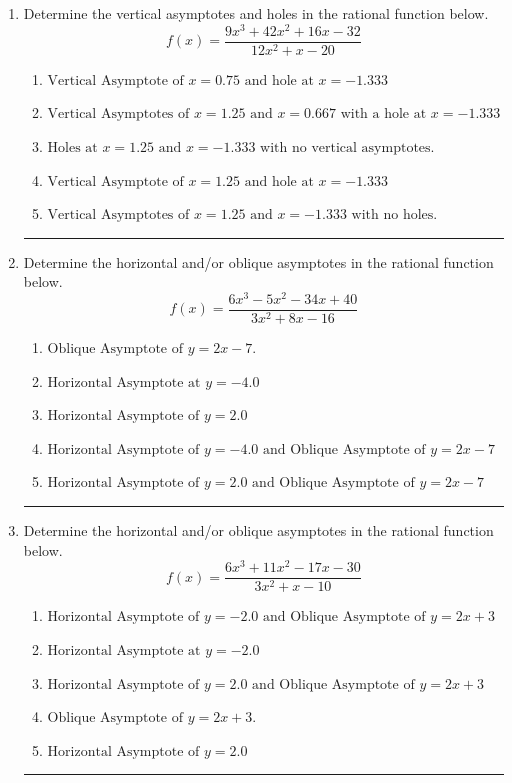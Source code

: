 \documentclass[14pt]{extbook}
\newcommand{\litem}[1]{\item#1\hspace*{-1cm}\rule{\textwidth}{0.4pt}}
\begin{document}
\begin{enumerate}
{\begin{enumerate}[label=\Alph*.]
\end{enumerate} }
\litem{
Determine the vertical asymptotes and holes in the rational function below.\[ f(x) = \frac{9x^{3} +42 x^{2} +16 x -32}{12x^{2} +x -20} \]\begin{enumerate}[label=\Alph*.]
\item \( \text{Vertical Asymptote of } x = 0.75 \text{ and hole at } x = -1.333 \)
\item \( \text{Vertical Asymptotes of } x = 1.25 \text{ and } x = 0.667 \text{ with a hole at } x = -1.333 \)
\item \( \text{Holes at } x = 1.25 \text{ and } x = -1.333 \text{ with no vertical asymptotes.} \)
\item \( \text{Vertical Asymptote of } x = 1.25 \text{ and hole at } x = -1.333 \)
\item \( \text{Vertical Asymptotes of } x = 1.25 \text{ and } x = -1.333 \text{ with no holes.} \)

\end{enumerate} }
\litem{
Determine the horizontal and/or oblique asymptotes in the rational function below.\[ f(x) = \frac{6x^{3} -5 x^{2} -34 x + 40}{3x^{2} +8 x -16} \]\begin{enumerate}[label=\Alph*.]
\item \( \text{Oblique Asymptote of } y = 2x -7. \)
\item \( \text{Horizontal Asymptote at } y = -4.0 \)
\item \( \text{Horizontal Asymptote of } y = 2.0  \)
\item \( \text{Horizontal Asymptote of } y = -4.0 \text{ and Oblique Asymptote of } y = 2x -7 \)
\item \( \text{Horizontal Asymptote of } y = 2.0 \text{ and Oblique Asymptote of } y = 2x -7 \)

\end{enumerate} }
\litem{
Determine the horizontal and/or oblique asymptotes in the rational function below.\[ f(x) = \frac{6x^{3} +11 x^{2} -17 x -30}{3x^{2} +x -10} \]\begin{enumerate}[label=\Alph*.]
\item \( \text{Horizontal Asymptote of } y = -2.0 \text{ and Oblique Asymptote of } y = 2x + 3 \)
\item \( \text{Horizontal Asymptote at } y = -2.0 \)
\item \( \text{Horizontal Asymptote of } y = 2.0 \text{ and Oblique Asymptote of } y = 2x + 3 \)
\item \( \text{Oblique Asymptote of } y = 2x + 3. \)
\item \( \text{Horizontal Asymptote of } y = 2.0  \)


\end{enumerate}}
\end{enumerate}
\end{document}
